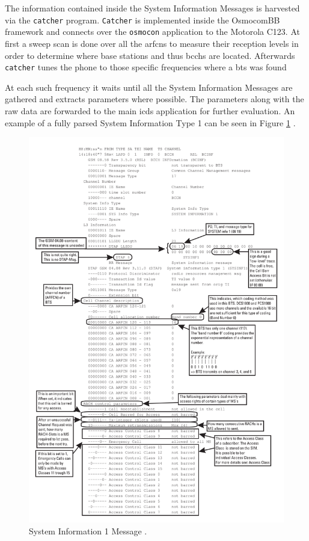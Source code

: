 The information contained inside the System Information Messages is harvested via the \texttt{catcher} program.
\texttt{Catcher} is implemented inside the OsmocomBB framework and connects over the \texttt{osmocon} application to the Motorola C123.
At first a sweep scan is done over all the \glspl{arfcn} to measure their reception levels in order to determine where base stations and thus \glspl{bcch} are located.
Afterwards \texttt{catcher} tunes the phone to those specific frequencies where a \gls{bts} was found 

At each such frequency it waits until all the System Information Messages are gathered and extracts parameters where possible.
The parameters along with the raw data are forwarded to the main \gls{icds} application for further evaluation.
An example of a fully parsed System Information Type 1 can be seen in Figure \ref{fig:si1} \cite{protocols1999}.
\begin{figure}
\centering
\includegraphics[width=.9\textwidth]{../Images/sysinfo1}
\caption{System Information 1 Message \cite{protocols1999}.}
\label{fig:si1}
\end{figure}
